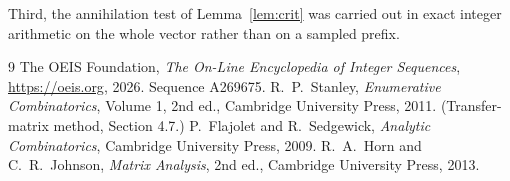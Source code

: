 \documentclass[11pt,a4paper]{article}
\theoremstyle{plain}
\theoremstyle{definition}
\begin{document}
Third, the annihilation test of Lemma~\ref{lem:crit} was carried out in exact integer
arithmetic on the whole vector rather than on a sampled prefix.

\begin{thebibliography}{9}
 The OEIS Foundation, \emph{The On-Line Encyclopedia of Integer
Sequences}, \url{https://oeis.org}, 2026. Sequence A269675.
 R.~P.~Stanley, \emph{Enumerative Combinatorics}, Volume 1, 2nd ed.,
Cambridge University Press, 2011. (Transfer-matrix method, Section 4.7.)
 P.~Flajolet and R.~Sedgewick, \emph{Analytic Combinatorics}, Cambridge
University Press, 2009.
 R.~A.~Horn and C.~R.~Johnson, \emph{Matrix Analysis}, 2nd ed., Cambridge
University Press, 2013.
\end{thebibliography}
\end{document}
